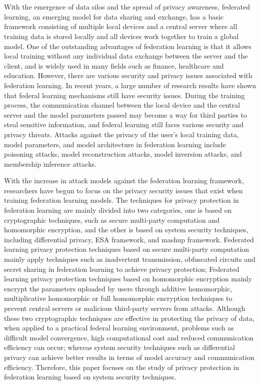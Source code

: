 \newpage
\vspace{-1cm}
\chapter*{}

With the emergence of data silos and the spread of privacy awareness, federated learning, an emerging model for data sharing and exchange, has a basic framework consisting of multiple local devices and a central server where all training data is stored locally and all devices work together to train a global model. One of the outstanding advantages of federation learning is that it allows local training without any individual data exchange between the server and the client, and is widely used in many fields such as finance, healthcare and education. However, there are various security and privacy issues associated with federation learning. In recent years, a large number of research results have shown that federal learning mechanisms still have security issues. During the training process, the communication channel between the local device and the central server and the model parameters passed may become a way for third parties to steal sensitive information, and federal learning still faces various security and privacy threats. Attacks against the privacy of the user's local training data, model parameters, and model architecture in federation learning include poisoning attacks, model reconstruction attacks, model inversion attacks, and membership inference attacks.

With the increase in attack models against the federation learning framework, researchers have begun to focus on the privacy security issues that exist when training federation learning models. The techniques for privacy protection in federation learning are mainly divided into two categories, one is based on cryptographic techniques, such as secure multi-party computation and homomorphic encryption, and the other is based on system security techniques, including differential privacy, ESA framework, and mashup framework. Federated learning privacy protection techniques based on secure multi-party computation mainly apply techniques such as inadvertent transmission, obfuscated circuits and secret sharing in federation learning to achieve privacy protection; Federated learning privacy protection techniques based on homomorphic encryption mainly encrypt the parameters uploaded by users through additive homomorphic, multiplicative homomorphic or full homomorphic encryption techniques to prevent central servers or malicious third-party servers from attacks. Although these two cryptographic techniques are effective in protecting the privacy of data, when applied to a practical federal learning environment, problems such as difficult model convergence, high computational cost and reduced communication efficiency can occur; whereas system security techniques such as differential privacy can achieve better results in terms of model accuracy and communication efficiency. Therefore, this paper focuses on the study of privacy protection in federation learning based on system security techniques.

